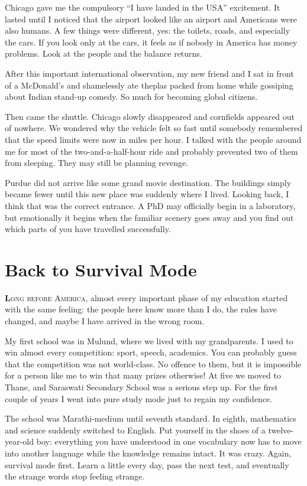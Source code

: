 \documentclass[11pt,twoside,openany]{book}
\newcommand{\dropcap}[2]{\lettrine[lines=3,findent=2pt,nindent=4pt]{\color{accent}\textsf{\textbf{#1}}}{#2}}
\begin{document}
Chicago gave me the compulsory ``I have landed in the USA'' excitement. It
lasted until I noticed that the airport looked like an airport and Americans
were also humans. A few things were different, yes: the toilets, roads, and
especially the cars. If you look only at the cars, it feels as if nobody in
America has money problems. Look at the people and the balance returns.

After this important international observation, my new friend and I sat in
front of a McDonald's and shamelessly ate theplas packed from home while
gossiping about Indian stand-up comedy. So much for becoming global citizens.

Then came the shuttle. Chicago slowly disappeared and cornfields appeared out
of nowhere. We wondered why the vehicle felt so fast until somebody remembered
that the speed limits were now in miles per hour. I talked with the people
around me for most of the two-and-a-half-hour ride and probably prevented two
of them from sleeping. They may still be planning revenge.

Purdue did not arrive like some grand movie destination. The buildings simply
became fewer until this new place was suddenly where I lived. Looking back, I
think that was the correct entrance. A PhD may officially begin in a
laboratory, but emotionally it begins when the familiar scenery goes away and
you find out which parts of you have travelled successfully.

\chapter{Back to Survival Mode}

\dropcap{L}{ong before America,} almost every important phase of my education
started with the same feeling: the people here know more than I do, the rules
have changed, and maybe I have arrived in the wrong room.

My first school was in Mulund, where we lived with my grandparents. I used to
win almost every competition: sport, speech, academics. You can probably guess
that the competition was not world-class. No offence to them, but it is
impossible for a person like me to win that many prizes otherwise! At five we
moved to Thane, and Saraswati Secondary School was a serious step up. For the
first couple of years I went into pure study mode just to regain my
confidence.

The school was Marathi-medium until seventh standard. In eighth, mathematics
and science suddenly switched to English. Put yourself in the shoes of a
twelve-year-old boy: everything you have understood in one vocabulary now has
to move into another language while the knowledge remains intact. It was
crazy. Again, survival mode first. Learn a little every day, pass the next
test, and eventually the strange words stop feeling strange.
\end{document}

